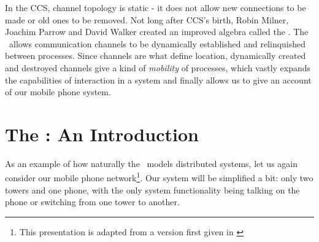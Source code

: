 	In the CCS, channel topology is static - it does not allow new connections to be made or old ones to be removed.  
Not long after CCS's birth, Robin Milner, Joachim Parrow and David Walker created an improved algebra called the \inidx{\picalc}.  
The \picalc\ allows communication channels to be dynamically established and relinquished between processes.  
Since channels are what define location, dynamically created and destroyed channels give a kind of \emph{mobility} of processes, which vastly expands the capabilities of interaction in a system and finally allows us to give an account of our mobile phone system.
\section{The \picalc: An Introduction}	
	As an example of how naturally the \picalc\ models distributed systems, let us again consider our mobile phone network\footnote{This presentation is adapted from a version first given in \cite{miln99}}.  
Our system will be simplified a bit: only two towers and one phone, with the only system functionality being talking on the phone or switching from one tower to another.
	
